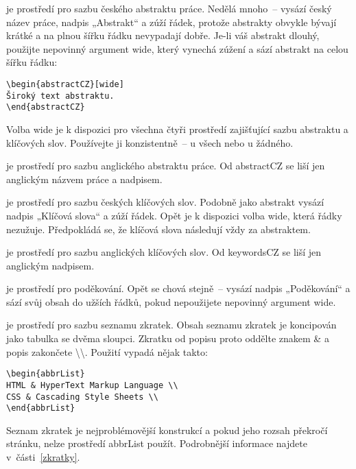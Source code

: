 \documentclass[FM,SP]{tulthesis}
\newcommand{\argument}[1]{{\ttfamily\color{\tulcolor}#1}}
\newcommand{\argumentindex}[1]{\argument{#1}\index{#1}}
\newcommand{\prostredi}[1]{\argumentindex{#1}}
\newenvironment{myquote}{\begin{list}{}{\setlength\leftmargin\parindent}\item[]}{\end{list}}
\newenvironment{listing}{\begin{myquote}\color{\tulcolor}}{\end{myquote}}
\begin{document}
\begin{description}
\item[\prostredi{abstractCZ}] je prostředí pro sazbu českého abstraktu práce.
Nedělá mnoho~-- vysází český název práce, nadpis „Abstrakt“ a zúží řádek,
protože abstrakty obvykle bývají krátké a na plnou šířku řádku nevypadají
dobře. Je-li váš abstrakt dlouhý, použijte nepovinný argument \argument{wide},
který vynechá zúžení a sází abstrakt na celou šířku řádku:

\begin{listing}
\begin{verbatim}
\begin{abstractCZ}[wide]
Široký text abstraktu.
\end{abstractCZ}
\end{verbatim}
\end{listing}

Volba \argument{wide} je k dispozici pro všechna čtyři prostředí zajišťující
sazbu abstraktu a klíčových slov. Používejte ji konzistentně~-- u všech nebo u
žádného.

\item[\prostredi{abstractEN}] je prostředí pro sazbu anglického abstraktu práce.
Od \argument{abstractCZ} se liší jen anglickým názvem práce a nadpisem.

\item[\prostredi{keywordsCZ}] je prostředí pro sazbu českých klíčových slov.
Podobně jako abstrakt vysází nadpis „Klíčová slova“ a zúží řádek. Opět je k
dispozici volba \argument{wide}, která řádky nezužuje. Předpokládá se, že
klíčová slova následují vždy za abstraktem.

\item[\prostredi{keywordsEN}] je prostředí pro sazbu anglických klíčových slov.
Od \argument{keywordsCZ} se liší jen anglickým nadpisem.

\item[\prostredi{acknowledgement}] je prostředí pro poděkování. Opět se chová
stejně~-- vysází nadpis „Poděkování“ a sází svůj obsah do užších řádků, pokud
nepoužijete nepovinný argument \argument{wide}.

\item[\prostredi{abbrList}] je prostředí pro sazbu seznamu zkratek. Obsah
seznamu zkratek je koncipován jako tabulka se dvěma sloupci. Zkratku od popisu
proto oddělte znakem \argument{\&} a popis zakončete
\argument{\textbackslash\textbackslash}. Použití vypadá nějak takto:

{\color{\tulcolor}
\begin{verbatim}
\begin{abbrList}
HTML & HyperText Markup Language \\
CSS & Cascading Style Sheets \\
\end{abbrList}
\end{verbatim}}

Seznam zkratek je nejproblémovější konstrukcí a pokud jeho rozsah překročí
stránku, nelze prostředí \argument{abbrList} použít. Podrobnější informace
najdete v~části~\ref{zkratky}.

\end{description}
\end{document}
